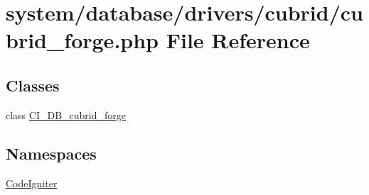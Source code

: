 \hypertarget{cubrid__forge_8php}{}\section{system/database/drivers/cubrid/cubrid\+\_\+forge.php File Reference}
\label{cubrid__forge_8php}
\subsection*{Classes}
\begin{DoxyCompactItemize}
\item 
class \mbox{\hyperlink{class_c_i___d_b__cubrid__forge}{C\+I\+\_\+\+D\+B\+\_\+cubrid\+\_\+forge}}
\end{DoxyCompactItemize}
\subsection*{Namespaces}
\begin{DoxyCompactItemize}
\item 
 \mbox{\hyperlink{namespace_code_igniter}{Code\+Igniter}}
\end{DoxyCompactItemize}
